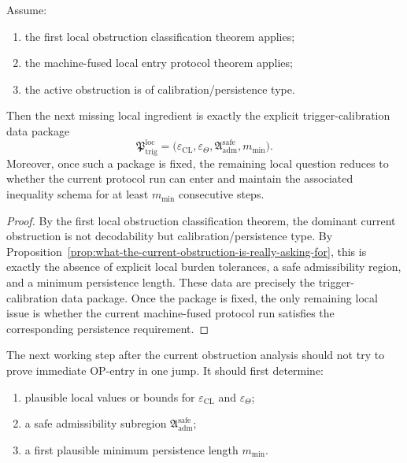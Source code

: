\begin{theorem}
\label{thm:first-local-trigger-calibration-theorem}
Assume:
\begin{enumerate}
    \item the first local obstruction classification theorem applies;
    \item the machine-fused local entry protocol theorem applies;
    \item the active obstruction is of calibration/persistence type.
\end{enumerate}
Then the next missing local ingredient is exactly the explicit trigger-calibration data package
\[
\mathfrak{P}_{\mathrm{trig}}^{\mathrm{loc}}
=
\bigl(
\varepsilon_{\mathrm{CL}},
\varepsilon_{\Theta},
\mathfrak{A}_{\mathrm{adm}}^{\mathrm{safe}},
 m_{\min}
\bigr).
\]
Moreover, once such a package is fixed, the remaining local question reduces to whether the current protocol run can enter and maintain the associated inequality schema for at least \(m_{\min}\) consecutive steps.
\end{theorem}

\begin{proof}
By the first local obstruction classification theorem, the dominant current obstruction is not decodability but calibration/persistence type.
By Proposition~\ref{prop:what-the-current-obstruction-is-really-asking-for}, this is exactly the absence of explicit local burden tolerances, a safe admissibility region, and a minimum persistence length.
These data are precisely the trigger-calibration data package.
Once the package is fixed, the only remaining local issue is whether the current machine-fused protocol run satisfies the corresponding persistence requirement.
\end{proof}

\begin{corollary}
\label{cor:next-post-r14-working-rule}
The next working step after the current obstruction analysis should not try to prove immediate OP-entry in one jump.
It should first determine:
\begin{enumerate}
    \item plausible local values or bounds for \(\varepsilon_{\mathrm{CL}}\) and \(\varepsilon_{\Theta}\);
    \item a safe admissibility subregion \(\mathfrak{A}_{\mathrm{adm}}^{\mathrm{safe}}\);
    \item a first plausible minimum persistence length \(m_{\min}\).
\end{enumerate}
\end{corollary}

